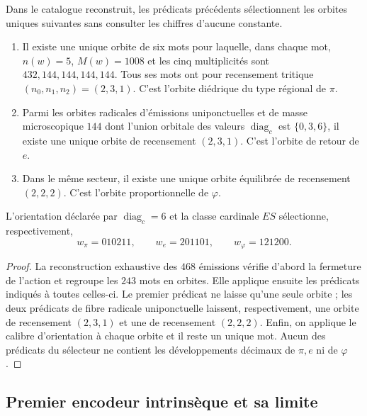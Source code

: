 \begin{theorem}
\label{thm:selectores-orbitales-constantes}
Dans le catalogue reconstruit, les prédicats précédents sélectionnent les
orbites uniques suivantes sans consulter les chiffres d'aucune constante.
\begin{enumerate}
  \item Il existe une unique orbite de six mots pour laquelle, dans chaque
  mot, \(n(w)=5\), \(M(w)=1008\) et les cinq multiplicités sont
  \(432,144,144,144,144\). Tous ses mots ont pour recensement tritique
  \((n_0,n_1,n_2)=(2,3,1)\). C'est l'orbite diédrique du type régional de
  \(\pi\).
  \item Parmi les orbites radicales d'émissions uniponctuelles et de masse
  microscopique \(144\) dont l'union orbitale des valeurs
  \(\operatorname{diag}_c\) est \(\{0,3,6\}\), il existe une unique
  orbite de recensement \((2,3,1)\). C'est l'orbite de retour de \(e\).
  \item Dans le même secteur, il existe une unique orbite équilibrée de recensement
  \((2,2,2)\). C'est l'orbite proportionnelle de \(\varphi\).
\end{enumerate}
L'orientation déclarée par
\(\operatorname{diag}_c=6\) et la classe cardinale \(ES\) sélectionne,
respectivement,
\[
 \boxed{
 w_\pi=010211,
 \qquad
 w_e=201101,
 \qquad
 w_\varphi=121200.
 }
\]
\end{theorem}

\begin{proof}
La reconstruction exhaustive des \(468\) émissions vérifie d'abord la
fermeture de l'action et regroupe les \(243\) mots en orbites. Elle applique ensuite
les prédicats indiqués à toutes celles-ci. Le premier prédicat ne laisse qu'une seule
orbite ; les deux prédicats de fibre radicale uniponctuelle laissent, respectivement, une
orbite de recensement \((2,3,1)\) et une de recensement \((2,2,2)\). Enfin, on
applique le calibre d'orientation à chaque orbite et il reste un unique mot.
Aucun des prédicats du sélecteur ne contient les développements décimaux de
\(\pi,e\) ni de \(\varphi\).
\end{proof}

\subsection{Premier encodeur intrinsèque et sa limite}

